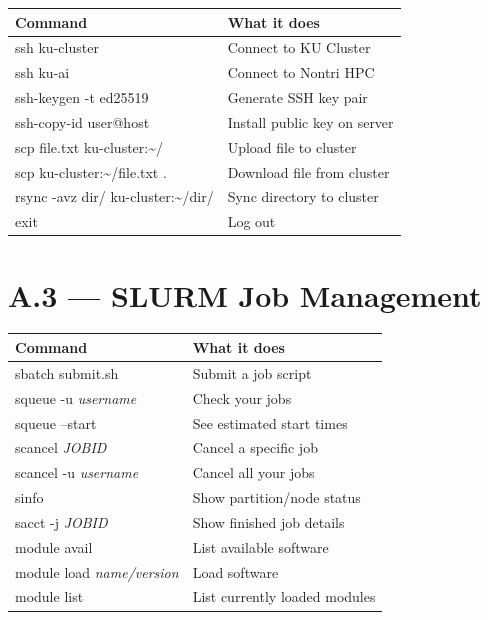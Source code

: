 \documentclass[12pt,a4paper]{article}
\begin{document}
\begin{center}
\renewcommand{\arraystretch}{1.3}
\begin{tabular}{>{\ttfamily}lp{8cm}}
\toprule
\normalfont\textbf{Command} & \textbf{What it does} \\
\midrule
ssh ku-cluster                        & Connect to KU Cluster \\
ssh ku-ai                             & Connect to Nontri HPC \\
ssh-keygen -t ed25519                 & Generate SSH key pair \\
ssh-copy-id user@host                 & Install public key on server \\
scp file.txt ku-cluster:\textasciitilde/        & Upload file to cluster \\
scp ku-cluster:\textasciitilde/file.txt .       & Download file from cluster \\
rsync -avz dir/ ku-cluster:\textasciitilde/dir/ & Sync directory to cluster \\
exit                                  & Log out \\
\bottomrule
\end{tabular}
\end{center}

\section*{A.3 --- SLURM Job Management}

\begin{center}
\renewcommand{\arraystretch}{1.3}
\begin{tabular}{>{\ttfamily}lp{8cm}}
\toprule
\normalfont\textbf{Command} & \textbf{What it does} \\
\midrule
sbatch submit.sh              & Submit a job script \\
squeue -u \textit{username}          & Check your jobs \\
squeue --start                & See estimated start times \\
scancel \textit{JOBID}               & Cancel a specific job \\
scancel -u \textit{username}         & Cancel all your jobs \\
sinfo                         & Show partition/node status \\
sacct -j \textit{JOBID}              & Show finished job details \\
module avail                  & List available software \\
module load \textit{name/version}    & Load software \\
module list                   & List currently loaded modules \\
\bottomrule
\end{tabular}
\end{center}
\end{document}
